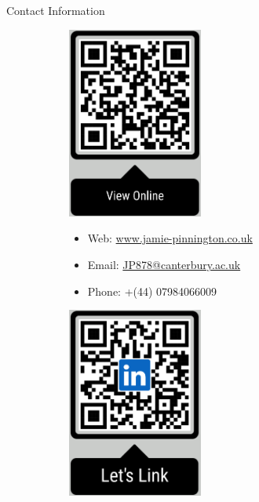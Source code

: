\documentclass{beamer} %
\begin{document}
\begin{frame}[t]
\begin{columns}[t]
\begin{column}{0.3\textwidth}


			\begin{block}{Contact Information}
				\begin{figure}
					\begin{subfigure}[t]{0.25\linewidth}
						\centering
						\includegraphics[width=1.75in,valign=t]{qr_online_v6.png}
					\end{subfigure}
					\begin{subfigure}[t]{0.45\linewidth}
						\begin{itemize}
							\item Web: \href{https://www.jamie-pinnington.co.uk}{www.jamie-pinnington.co.uk}
							\item Email: \href{mailto:JP878@canterbury.ac.uk}{JP878@canterbury.ac.uk}
							\item Phone: +(44) 07984066009
						\end{itemize}
					\end{subfigure}
					\begin{subfigure}[t]{0.25\linewidth}
						\centering
						\includegraphics[width=1.75in,valign=t]{qr_linked_v5.png}
					\end{subfigure}
				\end{figure}
			\end{block}


\end{column}
\end{columns}
\end{frame}
\end{document}

